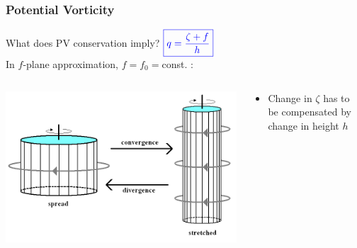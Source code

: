 \documentclass[12pt]{beamer}
\begin{document}
\begin{frame}
\frametitle{Potential Vorticity}
What does PV conservation imply? \hfill $\color{blue}\boxed{q=\frac{\zeta+f}{h}}$\\
\vspace{0.5cm}
In $f$-plane approximation, $f=f_0=$const. :
\vspace{0.2cm}
\begin{columns}
\begin{column}{0.48\textwidth}
	\includegraphics[width=\linewidth]{Potential_vorticity_conservation}
\end{column}
\begin{column}{0.48\textwidth}
	\begin{itemize}
		\item Change in $\zeta$ has to be compensated by change in height $h$
	\end{itemize}
\end{column}
\end{columns}
\end{frame}
\end{document}
